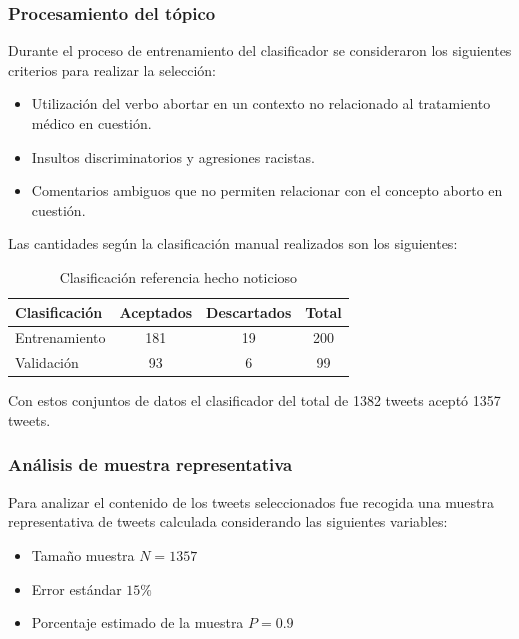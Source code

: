 \subsubsection{Procesamiento del tópico}

Durante el proceso de entrenamiento del clasificador se consideraron los siguientes criterios para realizar la selección:

\begin{itemize}
	\item Utilización del verbo abortar en un contexto no relacionado al tratamiento médico en cuestión.
	\item Insultos discriminatorios y agresiones racistas. 
	\item Comentarios ambiguos que no permiten relacionar con el concepto aborto en cuestión.
\end{itemize}

Las cantidades según la clasificación manual realizados son los siguientes:

\begin{table}[H]
	\centering
	\begin{tabular}{| l | c | c | c |}
		\hline
		Clasificación    & Aceptados & Descartados & Total \\ \hline
		Entrenamiento    & 181 & 19 & 200\\ \hline
		Validación		 & 93 & 6 & 99\\ \hline
	\end{tabular}
	\caption {Clasificación referencia hecho noticioso}
\end{table}

Con estos conjuntos de datos el clasificador del total de 1382 tweets aceptó 1357 tweets. \\

\subsubsection{Análisis de muestra representativa}

Para analizar el contenido de los tweets seleccionados fue recogida una muestra representativa de tweets calculada considerando las siguientes variables:

\begin{itemize}
	\item Tamaño muestra $N = 1357$
	\item Error estándar $15\%$	
	\item Porcentaje estimado de la muestra $P = 0.9$
\end{itemize}

